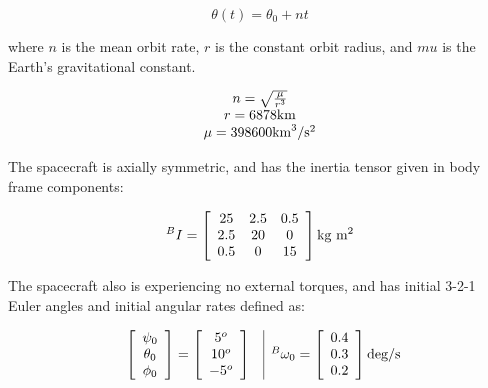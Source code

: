 \documentclass[]{aiaa-tc}%
\newcommand{\brackets} [1] {\left[ #1 \right]}
\newcommand{\arrayb}[2]{\brackets{ \begin{array}{#1}  #2 \end{array} } }
\begin{document}
\begin{equation}
	\theta(t) = \theta_0 + nt
	\label{eq:Theta(t)}
\end{equation} 

where $n$ is the mean orbit rate, $r$ is the constant orbit radius, and $mu$ is the Earth's gravitational constant. 

\begin{displaymath}
	\begin{array}{c}
		n=\sqrt{\frac{\mu}{r^3}}  						\\
		r = 6878 \textnormal{km}						\\
		\mu = 398600   \textnormal{km}^3/\textnormal{s}^2	\\
	\end{array}
\end{displaymath}

The spacecraft is axially symmetric, and has the inertia tensor given in body frame components:

\begin{displaymath}
^BI = 
	\arrayb{c c c}{
		 25  & 2.5 & 0.5	\\
		 2.5 & 20  &   0   \\
		 0.5 & 0    &   15  
	}
	\textnormal{kg m$^2$}
\end{displaymath}

The spacecraft also is experiencing no external torques, and has initial 3-2-1 Euler angles and initial angular rates defined as:

\begin{displaymath}
	\begin{array}{c | c}
		\begin{array}{c c}
			\arrayb{c}{
			\psi_0 	\\ 	\theta_0 		\\ \phi_0
			}
			=
			\arrayb{c}{
			5^o	\\ 	10^o		\\ -5^o
			}
		\end{array}
		&
		^B\omega_0 	=
			\arrayb{c}{
			0.4 	\\ 	0.3	\\  0.2
			}  \textnormal{deg/s}
	\end{array}
\end{displaymath}
\end{document}
